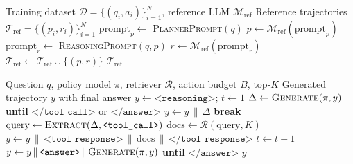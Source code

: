 \documentclass[11pt]{article}
\begin{document}
\begin{algorithm*}[t]
\caption{Reference Planner Generation}
\label{alg:ref_planner}
\begin{algorithmic}[1]
\REQUIRE Training dataset $\mathcal{D} = \{(q_i, a_i)\}_{i=1}^{N}$, reference LLM $\mathcal{M}_{\text{ref}}$
\ENSURE Reference trajectories $\mathcal{T}_{\text{ref}} = \{(p_i, r_i)\}_{i=1}^{N}$
    \STATE $\text{prompt}_p \gets$ \textsc{PlannerPrompt}$(q)$ 
    \STATE $p \gets \mathcal{M}_{\text{ref}}(\text{prompt}_p)$ 
    \STATE $\text{prompt}_r \gets$ \textsc{ReasoningPrompt}$(q, p)$ 
    \STATE $r \gets \mathcal{M}_{\text{ref}}(\text{prompt}_r)$ 
    \STATE $\mathcal{T}_{\text{ref}} \gets \mathcal{T}_{\text{ref}} \cup \{(p, r)\}$
\ENDFOR
\RETURN $\mathcal{T}_{\text{ref}}$
\end{algorithmic}
\end{algorithm*}

\begin{algorithm*}[t]
\caption{Agentic RAG Inference}
\label{alg:inference}
\begin{algorithmic}[1]
\REQUIRE Question $q$, policy model $\pi$, retriever $\mathcal{R}$, action budget $B$, top-$K$
\ENSURE Generated trajectory $y$ with final answer
\STATE $y \gets \texttt{<reasoning>}$; \quad $t \gets 1$
    \STATE $\Delta \gets \textsc{Generate}(\pi, y)$ \textbf{until} $\texttt{</tool\_call>}$ or $\texttt{</answer>}$
    \STATE $y \gets y \,\|\, \Delta$
        \STATE \textbf{break} 
    \ENDIF
        \STATE $\text{query} \gets \textsc{Extract}(\Delta, \texttt{<tool\_call>})$
        \STATE $\text{docs} \gets \mathcal{R}(\text{query}, K)$ 
        \STATE $y \gets y \,\|\, \texttt{<tool\_response>} \,\|\, \text{docs} \,\|\, \texttt{</tool\_response>}$
        \STATE $t \gets t + 1$
    \ENDIF
\ENDWHILE
{}
    \STATE $y \gets y \,\|\, \texttt{<answer>} \,\|\, \textsc{Generate}(\pi, y)$ \textbf{until} $\texttt{</answer>}$
\ENDIF
\RETURN $y$
\end{algorithmic}
\end{algorithm*}
\end{document}
